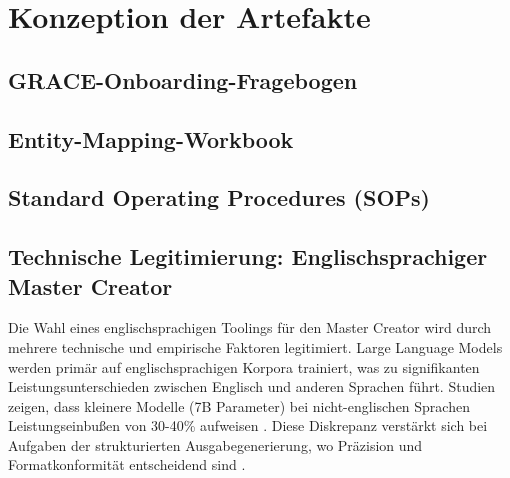 \section{Konzeption der Artefakte}
\label{sec:Konzeption}


\subsection{GRACE-Onboarding-Fragebogen}
\label{sec:Fragebogen_Konzept}



\subsection{Entity-Mapping-Workbook}
\label{sec:MappingWorkbook_Konzept}



\subsection{Standard Operating Procedures (SOPs)}
\label{sec:SOPs_Konzept}



\subsection{Technische Legitimierung: Englischsprachiger Master Creator}
\label{sec:TechnischeLegitimierung}


Die Wahl eines englischsprachigen Toolings für den Master Creator wird durch
mehrere technische und empirische Faktoren legitimiert. Large Language Models
werden primär auf englischsprachigen Korpora trainiert, was zu signifikanten
Leistungsunterschieden zwischen Englisch und anderen Sprachen führt. Studien
zeigen, dass kleinere Modelle (7B Parameter) bei nicht-englischen Sprachen
Leistungseinbußen von 30-40\% aufweisen \cite{llm:multilingual_performance2023,
llm:language_bias2023}. Diese Diskrepanz verstärkt sich bei Aufgaben der
strukturierten Ausgabegenerierung, wo Präzision und Formatkonformität
entscheidend sind \cite{llm:model_size_multilingual2024}.

